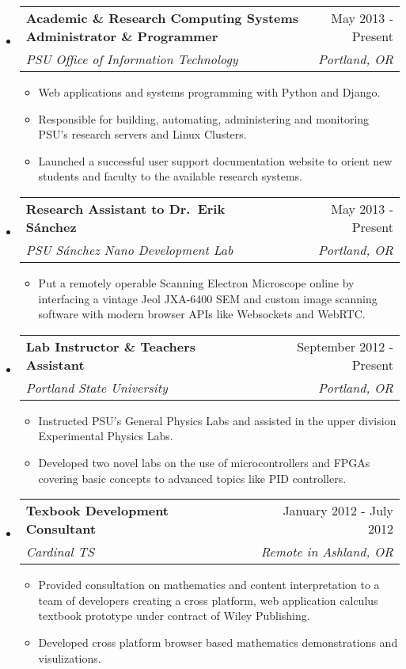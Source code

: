 \documentclass[letterpaper,11pt]{article}
\makeatletter
\newcommand{\resitem}[1]{\item #1 \vspace{-2pt}}
\newcommand{\resheading}[1]{{\large \fcolorbox{black}{mygrey}{\begin{minipage}{\textwidth}{\textbf{#1 \vphantom{p\^{E}}}}\end{minipage}}}}
\newcommand{\ressubheading}[4]{
\begin{tabular*}{7.0in}{l@{\extracolsep{\fill}}r}
		\textbf{#1} & #2 \\
		\textit{#3} & \textit{#4} \\
\end{tabular*}\vspace{-6pt}}
\makeatother
\begin{document}
\resheading{Experience}
\begin{itemize}

\item
\ressubheading
{Academic \& Research Computing Systems Administrator \& Programmer}
{May 2013 - Present}
{PSU Office of Information Technology}
{Portland, OR}
\begin{itemize}
    \resitem
    {Web applications and systems programming with Python and Django.}
    \resitem
    {Responsible for building, automating, administering and monitoring PSU's research servers and Linux Clusters.}
    \resitem
    {Launched a successful user support documentation website to orient new students and faculty to the available research systems.}
\end{itemize}

\item
\ressubheading
{Research Assistant to Dr.\ Erik S\'anchez}
{May 2013 - Present}
{PSU S\'anchez Nano Development Lab}
{Portland, OR}
\begin{itemize}
    \resitem
    {Put a remotely operable Scanning Electron Microscope online by interfacing a vintage Jeol JXA-6400 SEM and custom image scanning software with modern browser APIs like Websockets and WebRTC.}
\end{itemize}

\item
\ressubheading
{Lab Instructor \& Teachers Assistant}
{September 2012 - Present}
{Portland State University}
{Portland, OR}
\begin{itemize}
	\resitem
    {Instructed PSU's General Physics Labs and assisted in the upper division Experimental Physics Labs.}
	\resitem
    {Developed two novel labs on the use of microcontrollers and FPGAs covering basic concepts to advanced topics like PID controllers.}
\end{itemize}

\item
\ressubheading{Texbook Development Consultant}{January 2012 - July 2012}{Cardinal TS}{Remote in Ashland, OR}
\begin{itemize}
    \resitem
    {Provided consultation on mathematics and content interpretation to a team of developers creating a cross platform, web application calculus textbook prototype under contract of Wiley Publishing.}
	\resitem
    {Developed cross platform browser based mathematics demonstrations and visulizations.}
\end{itemize}


\end{itemize}
\end{document}
